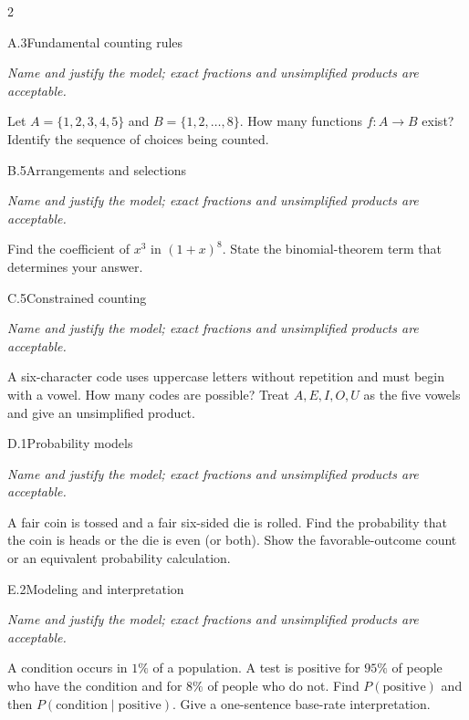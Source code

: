 \documentclass[9pt]{extarticle}
\begin{document}
\begin{multicols}{2}
\begin{CoreProblem}{A.3}{Fundamental counting rules}
{\scriptsize\textit{Name and justify the model; exact fractions and unsimplified products are acceptable.}\par}
Let $A=\{1,2,3,4,5\}$ and $B=\{1,2,\ldots,8\}$. How many functions
    $f:A\to B$ exist? Identify the sequence of choices being counted.
\end{CoreProblem}
\begin{CoreProblem}{B.5}{Arrangements and selections}
{\scriptsize\textit{Name and justify the model; exact fractions and unsimplified products are acceptable.}\par}
Find the coefficient of $x^3$ in $(1+x)^8$. State the binomial-theorem
    term that determines your answer.
\end{CoreProblem}
\begin{CoreProblem}{C.5}{Constrained counting}
{\scriptsize\textit{Name and justify the model; exact fractions and unsimplified products are acceptable.}\par}
A six-character code uses uppercase letters without repetition and
    must begin with a vowel. How many codes are possible? Treat
    $A,E,I,O,U$ as the five vowels and give an unsimplified product.
\end{CoreProblem}
\columnbreak
\begin{CoreProblem}{D.1}{Probability models}
{\scriptsize\textit{Name and justify the model; exact fractions and unsimplified products are acceptable.}\par}
A fair coin is tossed and a fair six-sided die is rolled. Find the
    probability that the coin is heads or the die is even (or both). Show the
    favorable-outcome count or an equivalent probability calculation.
\end{CoreProblem}
\begin{CoreProblem}{E.2}{Modeling and interpretation}
{\scriptsize\textit{Name and justify the model; exact fractions and unsimplified products are acceptable.}\par}
A condition occurs in $1\%$ of a population. A test is positive for
    $95\%$ of people who have the condition and for $8\%$ of people who do not.
    Find $P(\text{positive})$ and then
    $P(\text{condition}\mid\text{positive})$. Give a one-sentence base-rate
    interpretation.
\end{CoreProblem}
\end{multicols}
\end{document}
